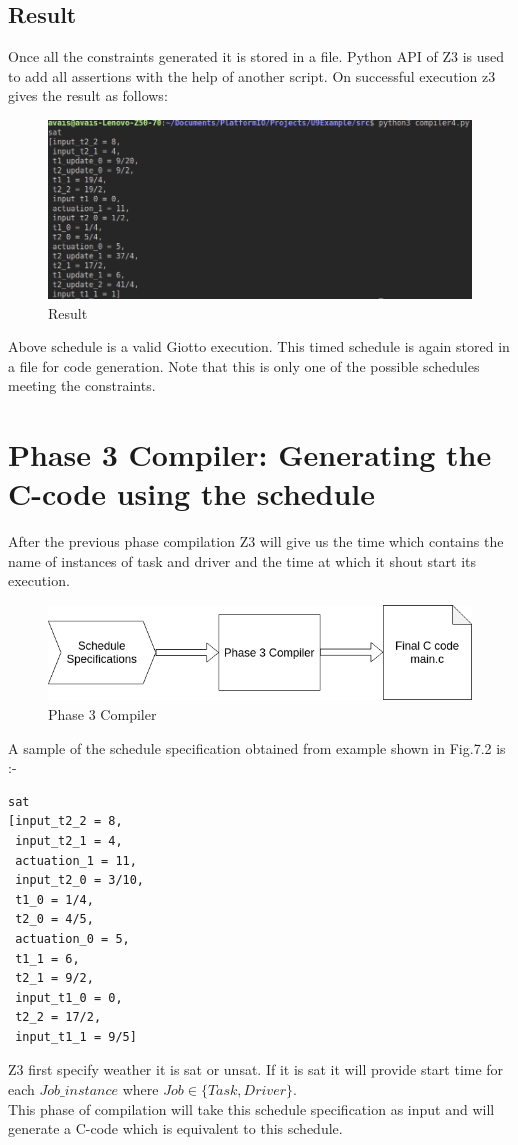 \documentclass[16pt]{report}
\begin{document}
\section{Result}
Once all the constraints generated it is stored in a file. Python API of Z3 is used to add all assertions with the help of another script.
On successful execution z3 gives the result as follows:
\begin{figure}[H]
\centering
\includegraphics[width=1\linewidth]{8ss.png}
\caption{Result}
\end{figure}
Above schedule is a valid Giotto execution. This timed schedule is again stored in a file for code generation.
Note that this is only one of the possible schedules meeting the constraints.

\chapter{Phase 3 Compiler: Generating the C-code using the schedule}
After the previous phase compilation Z3 will give us the time which contains the name of instances of task and driver and the time at which it shout start its execution.

\begin{figure}[H]
\centering
\includegraphics[width=1\linewidth]{11phase3.png}
\caption{Phase 3 Compiler}
\end{figure}

A sample of the schedule specification obtained from example shown in Fig.7.2 is :-
\begin{verbatim}
sat
[input_t2_2 = 8,
 input_t2_1 = 4,
 actuation_1 = 11,
 input_t2_0 = 3/10,
 t1_0 = 1/4,
 t2_0 = 4/5,
 actuation_0 = 5,
 t1_1 = 6,
 t2_1 = 9/2,
 input_t1_0 = 0,
 t2_2 = 17/2,
 input_t1_1 = 9/5]
\end{verbatim}
Z3 first specify weather it is sat or unsat. If it is sat it will provide start time for each $Job\_instance$ where $Job \in \{Task, Driver\}$.\\
This phase of compilation will take this schedule specification as input and will generate a C-code which is equivalent to this schedule.
\end{document}
